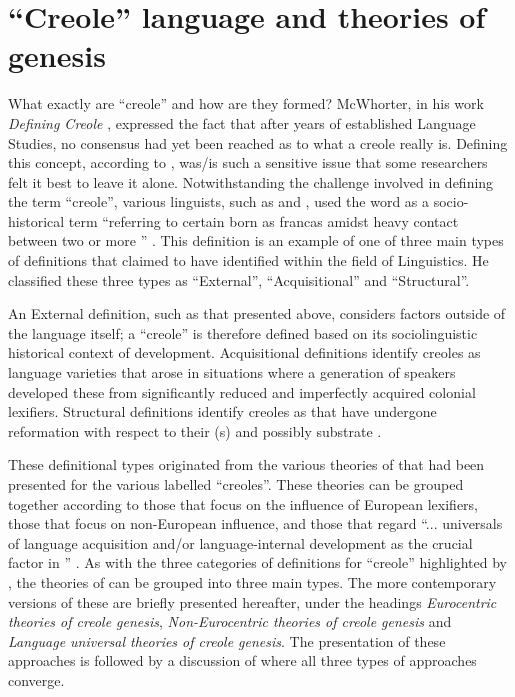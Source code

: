  
 \section {``{Creole}'' language and theories of genesis}\label{2.2}
What exactly are ``creole''  and how are they formed? McWhorter, in his work \emph {Defining Creole} \citep{McWhorter05}, expressed the fact that after years of established  Language Studies, no consensus had yet been reached as to what a creole really is. Defining this concept, according to  \citet{McWhorter05}, was/is such a sensitive issue that some researchers felt it best to leave it alone. Notwithstanding the challenge involved in defining the term ``creole'', various linguists, such as \citet{Kihm80} and \citet{Chaudenson92}, used the word as a socio-historical term ``referring to certain  born as  francas amidst heavy contact between two or more '' \citep[9]{McWhorter05}. This definition is an example of one of three main types of definitions that \citet{Hickey97} claimed to have identified within the field of  Linguistics. He classified these three types as ``External'', ``Acquisitional'' and ``Structural''.

An External definition, such as that presented above, considers factors outside of the language itself; a ``creole'' is therefore defined based on its sociolinguistic historical context of development. Acquisitional definitions identify creoles as language varieties that arose in situations where a generation of speakers developed these  from significantly reduced and imperfectly acquired colonial lexifiers. Structural definitions identify creoles as  that have undergone reformation with respect to their (s) and possibly substrate  \citep{Hickey97}.

These definitional types originated from the various theories of  that had been presented for the various  labelled ``creoles''. These theories can be grouped together according to those that focus on the influence of European lexifiers, those that focus on non-European influence, and those that regard ``... universals of language acquisition and/or language-internal development as the crucial factor in '' \citep[3]{Braun09}. As with the three categories of definitions for ``creole'' highlighted by  \citet{Hickey97}, the theories of  can be grouped into three main types. The more contemporary versions of these are briefly presented hereafter, under the headings \emph{Eurocentric theories of creole genesis}, \emph{Non-Eurocentric theories of creole genesis} and \emph{Language universal theories of creole genesis}. The presentation of these approaches is followed by a discussion of where all three types of approaches converge.

